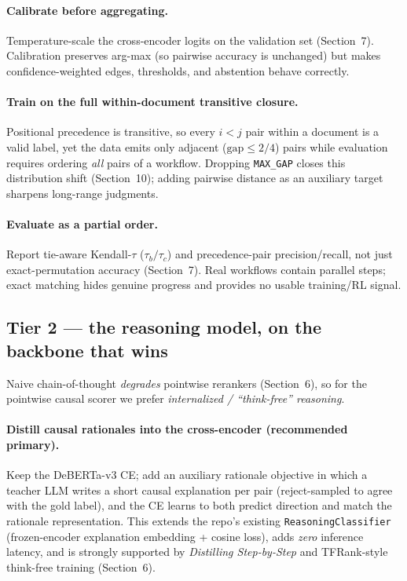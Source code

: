 \paragraph{Calibrate before aggregating.}
Temperature-scale the cross-encoder logits on the validation set (Section~7). Calibration
preserves arg-max (so pairwise accuracy is unchanged) but makes confidence-weighted edges,
thresholds, and abstention behave correctly.

\paragraph{Train on the full within-document transitive closure.}
Positional precedence is transitive, so every $i<j$ pair within a document is a valid label,
yet the data emits only adjacent ($\text{gap}\le 2/4$) pairs while evaluation requires
ordering \emph{all} pairs of a workflow. Dropping \texttt{MAX\_GAP} closes this distribution
shift (Section~10); adding pairwise distance as an auxiliary target sharpens long-range
judgments.

\paragraph{Evaluate as a partial order.}
Report tie-aware Kendall-$\tau$ ($\tau_b/\tau_c$) and precedence-pair precision/recall, not
just exact-permutation accuracy (Section~7). Real workflows contain parallel steps; exact
matching hides genuine progress and provides no usable training/RL signal.

\subsection{Tier 2 --- the reasoning model, on the backbone that wins}
Naive chain-of-thought \emph{degrades} pointwise rerankers (Section~6), so for the pointwise
causal scorer we prefer \emph{internalized / ``think-free'' reasoning}.
\paragraph{Distill causal rationales into the cross-encoder (recommended primary).}
Keep the DeBERTa-v3 CE; add an auxiliary rationale objective in which a teacher LLM writes a
short causal explanation per pair (reject-sampled to agree with the gold label), and the CE
learns to both predict direction and match the rationale representation. This extends the
repo's existing \texttt{ReasoningClassifier} (frozen-encoder explanation embedding +
cosine loss), adds \emph{zero} inference latency, and is strongly supported by
\emph{Distilling Step-by-Step} and TFRank-style think-free training (Section~6).
